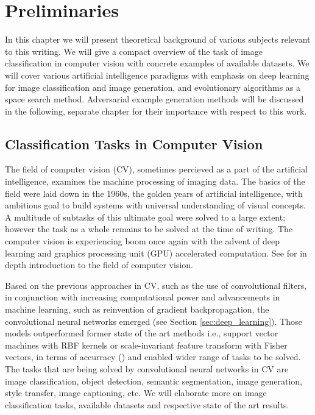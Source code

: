 \chapter{Preliminaries}
In this chapter we will present theoretical background of various subjects relevant to this writing. We will give a compact overview of the task of image classification in computer vision with concrete examples of available datasets. We will cover various artificial intelligence paradigms with emphasis on deep learning for image classification and image generation, and evolutionary algorithms as a space search method. Adversarial example generation methods will be discussed in the following, separate chapter for their importance with respect to this work.

\section{Classification Tasks in Computer Vision}
The field of computer vision (CV), sometimes percieved as a part of the artificial intelligence, examines the machine processing of imaging data. The basics of the field were laid down in the 1960s, the golden years of artificial intelligence, with ambitious goal to build systems with universal understanding of visual concepts. A multitude of subtasks of this ultimate goal were solved to a large extent; however the task as a whole remains to be solved at the time of writing. The computer vision is experiencing boom once again with the advent of deep learning and graphics processing unit (GPU) accelerated computation. See \cite{computer_vision} for in depth introduction to the field of computer vision.

Based on the previous approaches in CV, such as the use of convolutional filters, in conjunction with increasing computational power and advancements in machine learning, such as reinvention of gradient backpropagation, the convolutional neural networks emerged (see Section \ref{sec:deep_learning}). Those models outperformed former state of the art methods i.e., support vector machines with RBF kernels or scale-invariant feature transform with Fisher vectors, in terms of accurracy (\cite{NIPS2012_4824}) and enabled wider range of tasks to be solved. The tasks that are being solved by convolutional neural networks in CV are image classification, object detection, semantic segmentation, image generation, style transfer, image captioning, etc. We will elaborate more on image classification tasks, available datasets and respective state of the art results.


